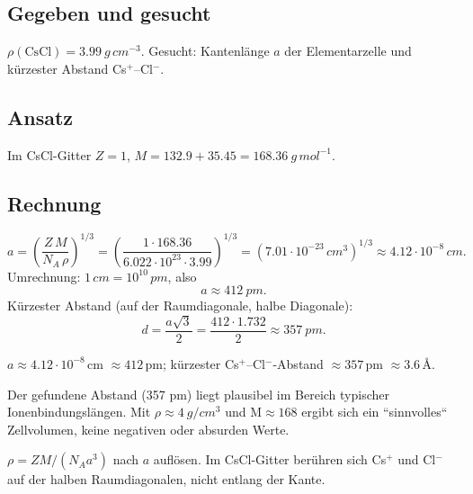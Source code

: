 
\subsection*{Gegeben und gesucht}
$\rho(\mathrm{CsCl}) = 3.99\ g\,cm^{-3}$. Gesucht: Kantenlänge $a$ der
Elementarzelle und kürzester Abstand Cs$^+$--Cl$^-$.

\subsection*{Ansatz}
Im CsCl-Gitter $Z=1$, $M = 132.9 + 35.45 = 168.36\ g\,mol^{-1}$.

\subsection*{Rechnung}
\[
  a = \left(\frac{Z\,M}{N_A\,\rho}\right)^{1/3}
    = \left(\frac{1\cdot168.36}{6.022\cdot10^{23}\cdot 3.99}\right)^{1/3}
    = \left(7.01\cdot10^{-23}\,cm^3\right)^{1/3}
    \approx 4.12\cdot10^{-8}\,cm .
\]
Umrechnung: $1\,cm = 10^{10}\,pm$, also
\[
  a \approx 412\ pm.
\]
Kürzester Abstand (auf der Raumdiagonale, halbe Diagonale):
\[
  d = \frac{a\sqrt{3}}{2}
    = \frac{412\cdot 1.732}{2} \approx 357\ pm.
\]

\begin{ergebnis}
$a \approx 4.12\cdot10^{-8}\,$cm $\approx 412\,$pm;
kürzester Cs$^+$--Cl$^-$-Abstand $\approx 357\,$pm $\approx 3.6\,$Å.
\end{ergebnis}

\begin{kontrolle}
Der gefundene Abstand (357 pm) liegt plausibel im Bereich typischer
Ionenbindungslängen. Mit $\rho\approx4\ g/cm^3$ und M$\approx168$ ergibt
sich ein ``sinnvolles`` Zellvolumen, keine negativen oder absurden Werte.
\end{kontrolle}

\begin{merksatz}
$\rho = ZM/(N_A a^3)$ nach $a$ auflösen. Im CsCl-Gitter berühren sich
Cs$^+$ und Cl$^-$ auf der halben Raumdiagonalen, nicht entlang der Kante.
\end{merksatz}
